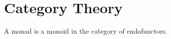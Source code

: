 \documentclass[12pt]{article}
\begin{document}
    \section{Category Theory}\label{sec:simps}
    A monad is a monoid in the category of endofunctors.
\end{document}
